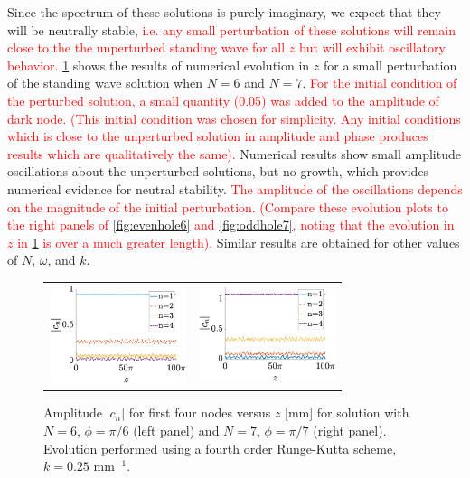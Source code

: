 \documentclass[reprint, amsmath,amssymb,aps,pra]{revtex4-2}
\renewcommand{\revised}[1]{ \textcolor{red}{#1} }
\begin{document}
Since the spectrum of these solutions is purely imaginary, we expect that they will be neutrally stable, \revised{i.e. any small perturbation of these solutions will remain close to the the unperturbed standing wave for all $z$ but will exhibit oscillatory behavior.} \cref{fig:evenhole6perturbed} shows the results of numerical evolution in $z$ for a small perturbation of the standing wave solution when $N=6$ and $N=7$. \revised{For the initial condition of the perturbed solution, a small quantity (0.05) was added to the amplitude of dark node. (This initial condition was chosen for simplicity. Any initial conditions which is close to the unperturbed solution in amplitude and phase produces results which are qualitatively the same).} Numerical results show small amplitude oscillations about the unperturbed solutions, but no growth, which provides numerical evidence for neutral stability. \revised{The amplitude of the oscillations depends on the magnitude of the initial perturbation. (Compare these evolution plots to the right panels of \cref{fig:evenhole6} and \cref{fig:oddhole7}, noting that the evolution in $z$ in \cref{fig:evenhole6perturbed} is over a much greater length).} Similar results are obtained for other values of $N$, $\omega$, and $k$.

\begin{figure}
\begin{center}
\begin{tabular}{cc}
\includegraphics[width=4cm]{evenhole6perturbed.eps} & 
\includegraphics[width=4cm]{oddhole7perturbed.eps}
\end{tabular}
\end{center}
\caption{Amplitude $|c_n|$ for first four nodes versus $z$ [mm] for solution with $N=6$, $\phi = \pi/6$ (left panel) and $N=7$, $\phi = \pi/7$ (right panel). Evolution performed using a fourth order Runge-Kutta scheme, $k=0.25 \text{ mm}^{-1}$.}
\label{fig:evenhole6perturbed}
\end{figure}
\end{document}
